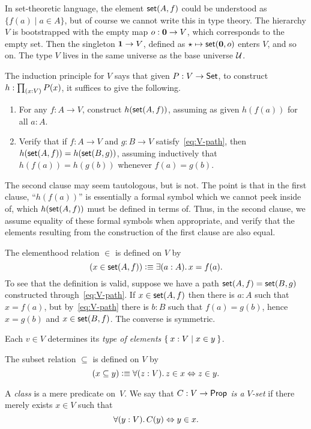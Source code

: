 In set-theoretic language, the element $\mathsf{set}(A,f)$ could be understood as $\{ f(a) \mid a
\in A \}$, but of course we cannot write this in type theory. The hierarchy $V$ is
bootstrapped with the empty map $o : \mathbf{0} \to V$, which corresponds to the empty set.
Then the singleton $\mathbf{1} \to V$, defined as $\star \mapsto \mathsf{set}(\mathbf{0}, o)$ enters $V$, and so
on. The type $V$ lives in the same universe as the base universe $\mathcal{U}$.

The induction principle for $V$ says that given $P:V\to \mathsf{Set}$, to construct $h:\prd{x:V} P(x)$, it suffices to give the following.
\begin{enumerate}
\item For any $f:A\to V$, construct $h(\mathsf{set}(A,f))$, assuming as given $h(f(a))$ for all $a:A$.
\item Verify that if $f : A \to V$ and $g : B \to V$ satisfy~\eqref{eq:V-path}, then $h(\mathsf{set}(A,f)) = h(\mathsf{set}(B,g))$, assuming inductively that $h(f(a)) = h(g(b))$ whenever $f(a)=g(b)$.
\end{enumerate}
The second clause may seem tautologous, but is not.
The point is that in the first clause, ``$h(f(a))$'' is essentially a formal symbol which we cannot peek inside of, which $h(\mathsf{set}(A,f))$ must be defined in terms of.
Thus, in the second clause, we assume equality of these formal symbols when appropriate, and verify that the elements resulting from the construction of the first clause are also equal.

The elementhood relation $\in$ is defined on $V$ by
%
\begin{equation*}
  (x \in \vset(A,f)) \defeq \exis{a : A} x = f(a).
\end{equation*}
%
To see that the definition is valid, suppose we have a path $\mathsf{set}(A, f) = \mathsf{set}(B, g)$
constructed through~\eqref{eq:V-path}. If $x \in \mathsf{set}(A,f)$ then there is $a : A$ such
that $x = f(a)$, but by~\eqref{eq:V-path} there is $b : B$ such that $f(a) = g(b)$, hence
$x = g(b)$ and $x \in \mathsf{set}(B,f)$. The converse is symmetric.

Each $v \in V$ determines its \emph{type of elements} $\Set{ x : V | x \in y }$.

The subset relation $\subseteq$ is defined on $V$ by
%
\begin{equation*}
  (x \subseteq y) \defeq \fall{z : V} z \in x \Leftrightarrow z \in y.
\end{equation*}

A \emph{class} is a mere predicate on~$V$. We say that \emph{$C : V \to \mathsf{Prop}$ is a
  $V$-set} if there merely exists $x \in V$ such that
%
\begin{equation*}
  \fall{y : V} C(y) \Leftrightarrow y \in x.
\end{equation*}

